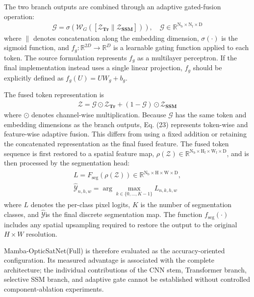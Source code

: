 \documentclass[a4paper,fleqn]{cas-dc}
\begin{document}
The two branch outputs are combined through an adaptive gated-fusion operation:
\begin{eqnarray}
	\mathbf{\mathcal{G}} = \sigma (\mathbf{\mathcal{W}}_G ([\mathbf{\mathcal{Z}_{Tr}}\| \mathbf{\mathcal{Z}_{SSM}}])), \quad \mathbf{\mathcal{G}} \in  \mathbb{R}^{\mathbf{\mathrm{N_b \times N_f \times D}}}
\end{eqnarray}
where \(\|\) denotes concatenation along the embedding dimension, \(\sigma (\cdot)\) is the sigmoid function, and \(f_g: \mathbb{R}^{2D} \rightarrow \mathbb{R}^D\) is a learnable gating function applied to each token. The source formulation represents \(f_g\) as a multilayer perceptron. If the final implementation instead uses a single linear projection, \(f_g\)  should be explicitly defined as \(f_g (U) = UW_g + b_g\).

The fused token representation is
\begin{eqnarray}
	\mathbf{\mathcal{Z}}  = \mathbf{\mathcal{G}} \odot \mathbf{\mathcal{Z}_{Tr}} + (1 - \mathbf{\mathcal{G}}) \odot \mathbf{\mathcal{Z}_{SSM}}
\end{eqnarray}
where \(\odot\)
denotes channel-wise multiplication. Because \(\mathbf{\mathcal{G}}\) has the same token and embedding dimensions as the branch outputs, Eq. (23) represents token-wise and feature-wise adaptive fusion. This differs from using a fixed addition or retaining the concatenated representation as the final fused feature.
The fused token sequence is first restored to a spatial feature map, \(\rho (\mathbf{\mathcal{Z}}) \in \mathbb{R}^{\mathbf{\mathrm{N_b \times H_f \times W_f \times D}}} \), and is then processed by the segmentation head:
\begin{eqnarray}
	\begin{aligned}
	L = F_{\mathrm{seg}}(\rho (\mathbf{\mathcal{Z}})) \in \mathbb{R}^{\mathbf{\mathrm{N_b \times H \times W \times D}}}, \\
	\mathbf{\hat{\mathcal{Y}}}_{n,h, w} = \arg \max_{k \in \{0,...,K-1\}} L_{n,k,h,w}
	\end{aligned}
\end{eqnarray}
where \(L\) denotes the per-class pixel logits, \(K\) is the number of segmentation classes, and \(\mathbf{\hat{\mathcal{Y}}}\)is the final discrete segmentation map. The function \(f_{\mathrm{seg}} (\cdot)\) includes any spatial upsampling required to restore the output to the original \(H\times W\) resolution.

Mamba-OpticSatNet(Full) is therefore evaluated as the accuracy-oriented configuration. Its measured advantage is associated with the complete architecture; the individual contributions of the CNN stem, Transformer branch, selective SSM branch, and adaptive gate cannot be established without controlled component-ablation experiments.
\end{document}
